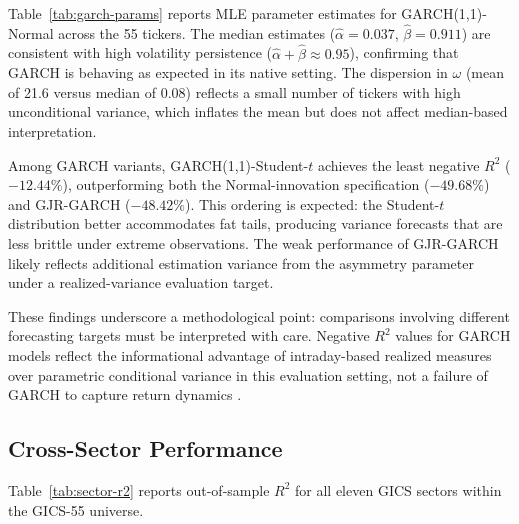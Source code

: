\documentclass[review]{elsarticle}
\begin{document}
Table~\ref{tab:garch-params} reports MLE parameter estimates for GARCH(1,1)-Normal across the 55 tickers. The median estimates ($\hat{\alpha} = 0.037$, $\hat{\beta} = 0.911$) are consistent with high volatility persistence ($\hat{\alpha} + \hat{\beta} \approx 0.95$), confirming that GARCH is behaving as expected in its native setting. The dispersion in $\omega$ (mean of 21.6 versus median of 0.08) reflects a small number of tickers with high unconditional variance, which inflates the mean but does not affect median-based interpretation.

Among GARCH variants, GARCH(1,1)-Student-$t$ achieves the least negative $R^2$ ($-12.44\%$), outperforming both the Normal-innovation specification ($-49.68\%$) and GJR-GARCH ($-48.42\%$). This ordering is expected: the Student-$t$ distribution better accommodates fat tails, producing variance forecasts that are less brittle under extreme observations. The weak performance of GJR-GARCH likely reflects additional estimation variance from the asymmetry parameter under a realized-variance evaluation target.

These findings underscore a methodological point: comparisons involving different forecasting targets must be interpreted with care. Negative $R^2$ values for GARCH models reflect the informational advantage of intraday-based realized measures over parametric conditional variance in this evaluation setting, not a failure of GARCH to capture return dynamics \cite{andersen1998}.

\subsection{Cross-Sector Performance}\label{sec:sector-analysis}

Table~\ref{tab:sector-r2} reports out-of-sample $R^2$ for all eleven GICS sectors within the GICS-55 universe. %
\end{document}
